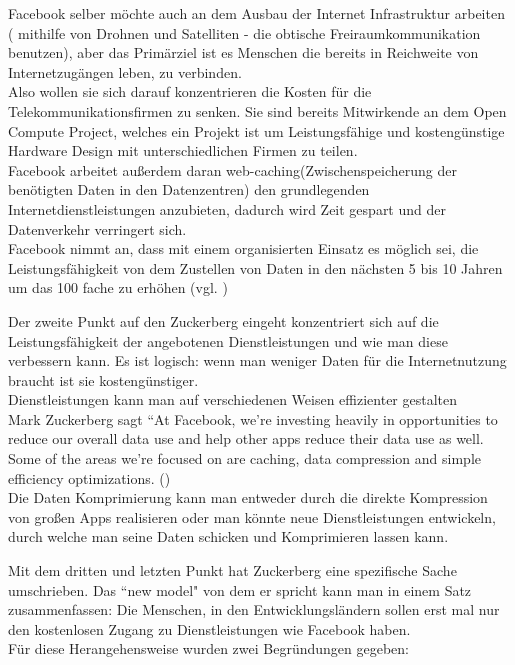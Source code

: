 \documentclass{article}
\begin{document}
Facebook selber möchte auch an dem Ausbau der Internet Infrastruktur arbeiten ( mithilfe von Drohnen und Satelliten - die obtische    
Freiraumkommunikation benutzen), aber das Primärziel ist es Menschen die bereits in Reichweite von Internetzugängen leben, zu
verbinden.\\
Also wollen sie sich darauf konzentrieren die Kosten für die Telekommunikationsfirmen zu senken.
Sie sind bereits Mitwirkende an dem Open Compute Project, welches ein Projekt ist um Leistungsfähige und kostengünstige Hardware 
Design mit unterschiedlichen Firmen zu teilen. \\
Facebook arbeitet außerdem daran web-caching(Zwischenspeicherung der benötigten Daten in den Datenzentren) den grundlegenden 
Internetdienstleistungen anzubieten, dadurch wird Zeit gespart und der Datenverkehr verringert sich.\\

Facebook nimmt an, dass mit einem organisierten Einsatz es möglich sei, die Leistungsfähigkeit von dem Zustellen von Daten in den   
nächsten 5 bis 10 Jahren um das 100 fache zu erhöhen  (vgl. \cite{HumanRight})\\

\medskip

Der zweite Punkt auf den Zuckerberg eingeht konzentriert sich auf die Leistungsfähigkeit der angebotenen Dienstleistungen und wie man    diese verbessern kann. Es ist logisch: wenn man weniger Daten für die Internetnutzung braucht ist sie kostengünstiger.\\

Dienstleistungen kann man auf verschiedenen Weisen effizienter gestalten\\

Mark Zuckerberg sagt ``At Facebook, we’re investing heavily in opportunities to reduce our overall data use and help  other apps     
reduce their data use as well. Some of the areas we’re focused on are caching, data compression and simple efficiency optimizations.
(\cite{HumanRight})\\

Die Daten Komprimierung kann man entweder durch die direkte Kompression von großen Apps realisieren oder man könnte neue Dienstleistungen entwickeln, durch welche man seine Daten schicken und Komprimieren lassen kann.\\

\medskip

Mit dem dritten und letzten Punkt hat Zuckerberg eine spezifische Sache umschrieben.
Das ``new model" von dem er spricht kann man in einem Satz zusammenfassen:
Die Menschen, in den Entwicklungsländern sollen erst mal nur den kostenlosen Zugang zu Dienstleistungen wie Facebook haben.\\
Für diese Herangehensweise wurden zwei Begründungen gegeben:\\
\end{document}
